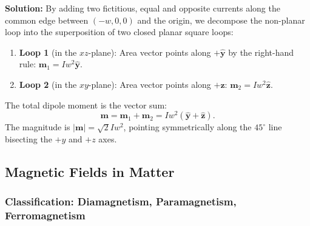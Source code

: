 \begin{example}
\begin{center}
    \end{center}

    \textbf{Solution:}
    By adding two fictitious, equal and opposite currents along the common edge between $(-w,0,0)$ and the origin, we decompose the non-planar loop into the superposition of two closed planar square loops:
    \begin{enumerate}
        \item \textbf{Loop 1} (in the $xz$-plane): Area vector points along $+\hat{\bm{y}}$ by the right-hand rule: $\bm{m}_1 = I w^2 \hat{\bm{y}}$.
        \item \textbf{Loop 2} (in the $xy$-plane): Area vector points along $+\hat{\bm{z}}$: $\bm{m}_2 = I w^2 \hat{\bm{z}}$.
    \end{enumerate}
    The total dipole moment is the vector sum:
    \begin{equation}
        \bm{m} = \bm{m}_1 + \bm{m}_2 = I w^2 (\hat{\bm{y}} + \hat{\bm{z}}).
    \end{equation}
    The magnitude is $|\bm{m}| = \sqrt{2} I w^2$, pointing symmetrically along the $45^\circ$ line bisecting the $+y$ and $+z$ axes.
\end{example}

\subsection{Magnetic Fields in Matter}

\subsubsection{Classification: Diamagnetism, Paramagnetism, Ferromagnetism}

